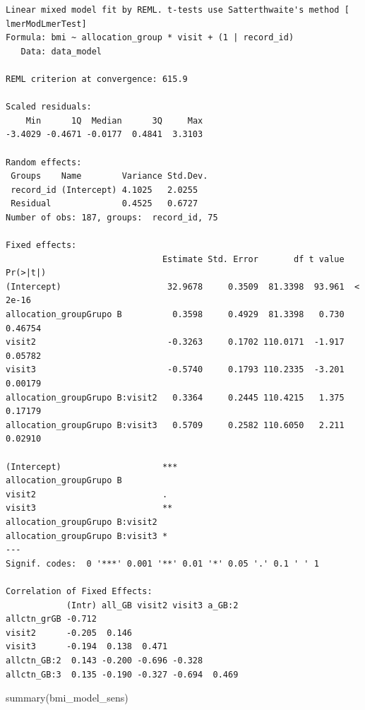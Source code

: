 \documentclass[
  letterpaper,
  DIV=11,
  numbers=noendperiod]{scrartcl}
\newenvironment{Shaded}{\begin{snugshade}}{\end{snugshade}}
\newcommand{\FunctionTok}[1]{\textcolor[rgb]{0.28,0.35,0.67}{#1}}
\newcommand{\NormalTok}[1]{\textcolor[rgb]{0.00,0.23,0.31}{#1}}
\begin{document}
\begin{verbatim}
Linear mixed model fit by REML. t-tests use Satterthwaite's method [
lmerModLmerTest]
Formula: bmi ~ allocation_group * visit + (1 | record_id)
   Data: data_model

REML criterion at convergence: 615.9

Scaled residuals: 
    Min      1Q  Median      3Q     Max 
-3.4029 -0.4671 -0.0177  0.4841  3.3103 

Random effects:
 Groups    Name        Variance Std.Dev.
 record_id (Intercept) 4.1025   2.0255  
 Residual              0.4525   0.6727  
Number of obs: 187, groups:  record_id, 75

Fixed effects:
                               Estimate Std. Error       df t value Pr(>|t|)
(Intercept)                     32.9678     0.3509  81.3398  93.961  < 2e-16
allocation_groupGrupo B          0.3598     0.4929  81.3398   0.730  0.46754
visit2                          -0.3263     0.1702 110.0171  -1.917  0.05782
visit3                          -0.5740     0.1793 110.2335  -3.201  0.00179
allocation_groupGrupo B:visit2   0.3364     0.2445 110.4215   1.375  0.17179
allocation_groupGrupo B:visit3   0.5709     0.2582 110.6050   2.211  0.02910
                                  
(Intercept)                    ***
allocation_groupGrupo B           
visit2                         .  
visit3                         ** 
allocation_groupGrupo B:visit2    
allocation_groupGrupo B:visit3 *  
---
Signif. codes:  0 '***' 0.001 '**' 0.01 '*' 0.05 '.' 0.1 ' ' 1

Correlation of Fixed Effects:
            (Intr) all_GB visit2 visit3 a_GB:2
allctn_grGB -0.712                            
visit2      -0.205  0.146                     
visit3      -0.194  0.138  0.471              
allctn_GB:2  0.143 -0.200 -0.696 -0.328       
allctn_GB:3  0.135 -0.190 -0.327 -0.694  0.469
\end{verbatim}

\begin{Shaded}
\begin{Highlighting}[]
\FunctionTok{summary}\NormalTok{(bmi\_model\_sens)}
\end{Highlighting}
\end{Shaded}
\end{document}
